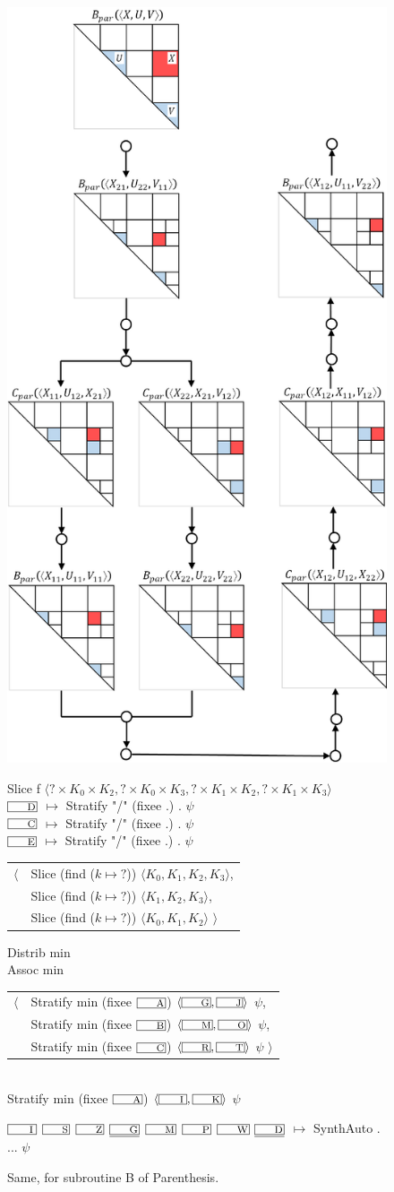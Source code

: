 \begin{figure}
\begin{center}
\includegraphics[width=.3\textwidth]{img/par-B.pdf}
\end{center}
%
\begin{transcript}
Slice f $\langle?\times K_0\times K_2, ?\times K_0\times K_3, ?\times K_1\times K_2, ?\times K_1\times K_3\rangle$ \\
$\lbox D$ $\mapsto$ Stratify "/" (fixee .) . $\psi$ \\
$\lbox C$ $\mapsto$ Stratify "/" (fixee .) . $\psi$ \\
$\lbox E$ $\mapsto$ Stratify "/" (fixee .) . $\psi$

\begin{tabular}{@{}l@{~}l@{}}
$\langle$ & Slice (find  ($k \mapsto {?}$)) $\langle K_0, K_1, K_2, K_3\rangle$, \\
& Slice (find  ($k \mapsto {?}$)) $\langle K_1, K_2, K_3\rangle$, \\
& Slice (find  ($k \mapsto {?}$)) $\langle K_0, K_1, K_2\rangle$ $\rangle$
\end{tabular}

Distrib min \\
Assoc min

\begin{tabular}{@{}l@{~}l@{}}
$\langle$ & Stratify min (fixee $\lbox A$) $\langle \lbox G, \lbox J\rangle$ $\psi$, \\
& Stratify min (fixee $\lbox B$) $\langle \lbox M, \lbox O\rangle$ $\psi$, \\
& Stratify min (fixee $\lbox C$) $\langle \lbox R, \lbox T\rangle$ $\psi$ $\rangle$
\end{tabular}\\
Stratify min (fixee $\lbox A$) $\langle \lbox{\,I\,}, \lbox K\rangle$ $\psi$

$\lbox{\,I\,}$ $\lbox S$ $\lbox Z$ $\underline{\lbox G}$ 
$\lbox M$ $\lbox P$ $\lbox W$ $\underline{\lbox D}$
$\mapsto$ SynthAuto . ... $\psi$
\end{transcript}
\caption{\label{annex:Paren-B}
Same, for subroutine B of Parenthesis.}
\end{figure}

